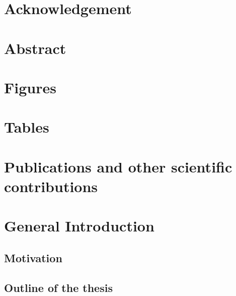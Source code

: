\documentclass{book}
\begin{document}


\tableofcontents

\chapter*{Acknowledgement}


\chapter*{Abstract}
\setcounter{page}{3}


\chapter*{Figures}

\chapter*{Tables}

\printglossary[title={List of Abbreviations}]

\chapter*{Publications and other scientific contributions}


\chapter{General Introduction}\label{chap:intro}

    \section{Motivation}
    
    \label{sec:motivation}
    
    \section{Outline of the thesis}
    \label{sec:outline}
    
\end{document}
